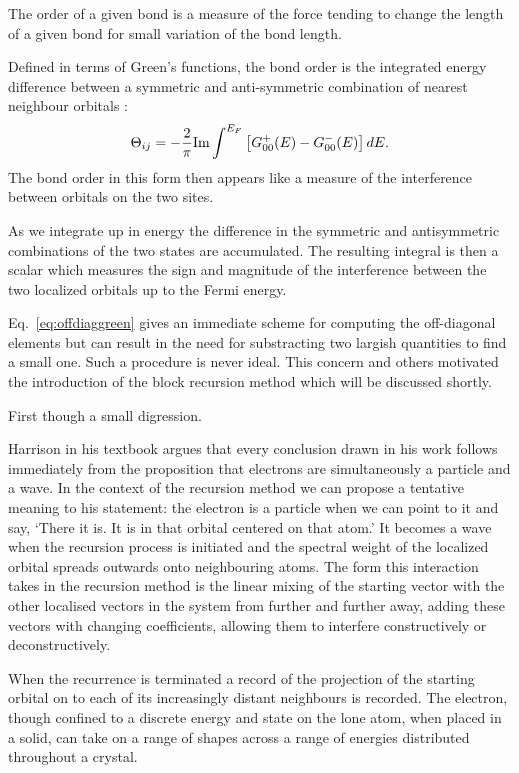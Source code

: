 The order of a given bond is a measure
of the force tending to change the length of a given bond
for small variation of the bond length.

Defined in terms of Green's functions, the bond order is the integrated 
energy difference between a symmetric and anti-symmetric combination 
of nearest neighbour orbitals \cite{pettifor89}:
%
\begin{equation}
\label{eq:bondorder}
\Theta_{ij} = - \frac{2}{\pi} {\rm Im} \int^{E_{F}}\left[G^{+}_{00}(E)-G_{00}^{-}(E)\right]dE.
\end{equation}
%
The bond order in this form then appears like a measure of the interference 
between orbitals on the two sites.

As we integrate up in energy the difference in the symmetric and antisymmetric 
combinations of the two states are accumulated. The resulting integral is 
then a scalar which measures the sign and magnitude of the
interference between the two localized orbitals up to the Fermi energy.

Eq.~\ref{eq:offdiaggreen} gives an immediate scheme for computing the 
off-diagonal elements but can result in the need for substracting 
two largish quantities to find a small one. Such a procedure 
is never ideal. This concern and others motivated the introduction
of the block recursion method which will be discussed shortly.

First though a small digression.

Harrison in his textbook argues that every conclusion drawn in 
his work follows immediately from the proposition that electrons 
are simultaneously a particle and a wave. 
In the context of the recursion method we can propose 
a tentative meaning to his statement: the electron is a 
particle when we can point to it and say, `There it is. 
It is in that orbital centered on that atom.' It becomes a wave 
when the recursion process is initiated and the spectral weight of the 
localized orbital spreads outwards onto neighbouring atoms. 
The form this interaction takes in the recursion method 
is the linear mixing of the starting vector
with the other localised vectors in the system from 
further and further away, adding these vectors with changing coefficients,
allowing them to interfere constructively or deconstructively. 

When the recurrence is terminated a record of the projection of 
the starting orbital on to each of its increasingly distant neighbours 
is recorded. The electron, though confined to a discrete energy 
and state on the lone atom, when placed in a solid, can 
take on a range of shapes across a range of energies distributed 
throughout a crystal.

